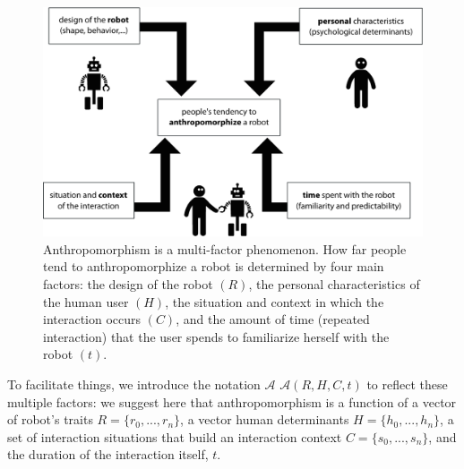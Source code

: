 \documentclass{frontiersSCNS} %
\newcommand{\Ant}[1][]{%
      \ifthenelse{\isempty{#1}}%
        {$\mathcal{A}$}
        {$\mathcal{A}(#1)$}
}
\begin{document}
\begin{figure}
    \centering
    \includegraphics[width=0.7\columnwidth]{factors}
    \caption{Anthropomorphism is a multi-factor phenomenon. How far people tend to anthropomorphize a robot is determined by four main factors: the design of the robot $(R)$, the personal characteristics of the human user $(H)$, the situation and context in which the interaction occurs $(C)$, and the amount of time (repeated interaction) that the user spends to familiarize herself with the robot $(t)$.}
    \label{factors}
\end{figure}

To facilitate things, we introduce the notation \Ant[R,H,C,t] to reflect these multiple factors: we suggest here that
anthropomorphism is a function of a vector of robot's traits $R = \{r_0,...,r_n\}$, a vector human
determinants $H = \{h_0,...,h_n\}$, a set of interaction situations that build
an interaction context $C = \{s_0,...,s_n\}$, and the duration of the
interaction itself, $t$.

\end{document}
